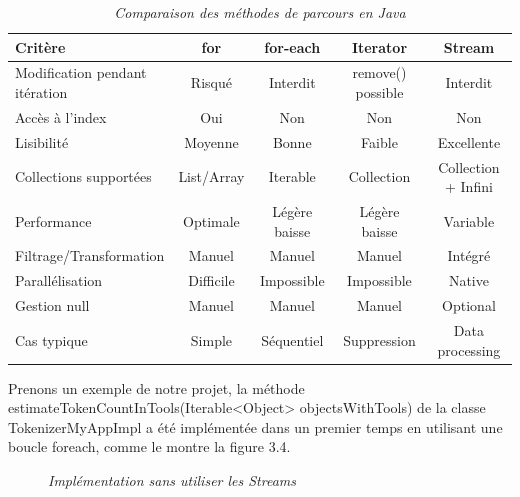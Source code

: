 \documentclass[12pt,a4paper]{report}
\begin{document}
	\begin{table}[H]
		\centering
		\caption{\textit{Comparaison des méthodes de parcours en Java}}
		\begin{tabular}{|l|c|c|c|c|}
			\hline
			\textbf{Critère} & \textbf{for} & \textbf{for-each} & \textbf{Iterator} & \textbf{Stream} \\
			\hline
			\makecell[l]{Modification pendant \\ itération}
			 & Risqué & Interdit & remove() possible & Interdit \\
			\hline
			Accès à l'index & Oui & Non & Non & Non \\
			\hline
			Lisibilité & Moyenne & Bonne & Faible & Excellente \\
			\hline
			Collections supportées & List/Array & Iterable & Collection & Collection + Infini \\
			\hline
			Performance & Optimale & Légère baisse & Légère baisse & Variable \\
			\hline
			Filtrage/Transformation & Manuel & Manuel & Manuel & Intégré \\
			\hline
			Parallélisation & Difficile & Impossible & Impossible & Native \\
			\hline
			Gestion null & Manuel & Manuel & Manuel & Optional \\
			\hline
			Cas typique & Simple & Séquentiel & Suppression & Data processing \\
			\hline
		\end{tabular}
	\end{table}
	
	Prenons un exemple de notre projet, la méthode \\ estimateTokenCountInTools(Iterable<Object> objectsWithTools) de la classe TokenizerMyAppImpl a été implémentée dans un premier temps en utilisant une boucle foreach, comme le montre la figure 3.4.
	
	\begin{figure}[H]
		\centering
		\caption{\textit{Implémentation sans utiliser les Streams}}
		\label{fig:before-stream}
	\end{figure}
	
\end{document}
